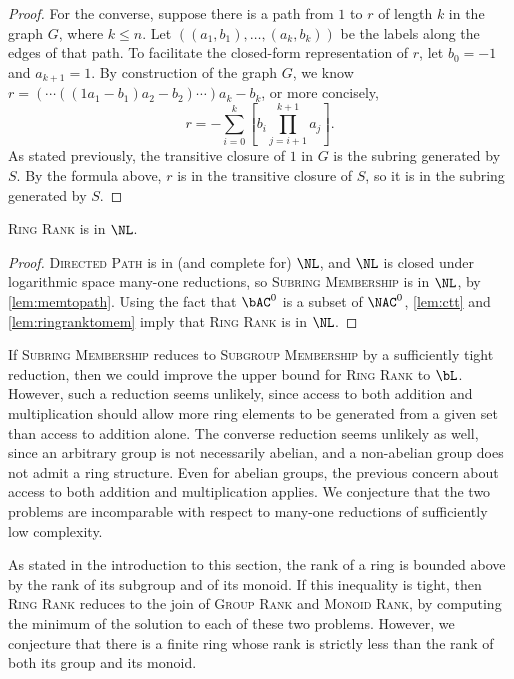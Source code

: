 \documentclass{article}
\begin{document}
\begin{proof}
  For the converse, suppose there is a path from $1$ to $r$ of length $k$ in the graph $G$, where $k \leq n$.
  Let $((a_1, b_1), \dotsc, (a_k, b_k))$ be the labels along the edges of that path.
  To facilitate the closed-form representation of $r$, let $b_0 = -1$ and $a_{k + 1} = 1$.
  By construction of the graph $G$, we know $r = (\dotsb ((1 a_1 - b_1) a_2 - b_2) \dotsb) a_k - b_k$, or more concisely,
  \begin{equation*}
    r = -\sum_{i = 0}^k \left[b_i \prod_{j = i + 1}^{k + 1} a_j\right].
  \end{equation*}
  As stated previously, the transitive closure of $1$ in $G$ is the subring generated by $S$.
  By the formula above, $r$ is in the transitive closure of $S$, so it is in the subring generated by $S$.
\end{proof}

\begin{theorem}\label{thm:ringrank}
  \textsc{Ring Rank} is in $\NL$.
\end{theorem}
\begin{proof}
  \textsc{Directed Path} is in (and complete for) $\NL$, and $\NL$ is closed under logarithmic space many-one reductions, so \textsc{Subring Membership} is in $\NL$, by \autoref{lem:memtopath}.
  Using the fact that $\bAC^0$ is a subset of $\NAC^0$, \autoref{lem:ctt} and \autoref{lem:ringranktomem} imply that \textsc{Ring Rank} is in $\NL$.
\end{proof}

If \textsc{Subring Membership} reduces to \textsc{Subgroup Membership} by a sufficiently tight reduction, then we could improve the upper bound for \textsc{Ring Rank} to $\bL$.
However, such a reduction seems unlikely, since access to both addition and multiplication should allow more ring elements to be generated from a given set than access to addition alone.
The converse reduction seems unlikely as well, since an arbitrary group is not necessarily abelian, and a non-abelian group does not admit a ring structure.
Even for abelian groups, the previous concern about access to both addition and multiplication applies.
We conjecture that the two problems are incomparable with respect to many-one reductions of sufficiently low complexity.

As stated in the introduction to this section, the rank of a ring is bounded above by the rank of its subgroup and of its monoid.
If this inequality is tight, then \textsc{Ring Rank} reduces to the join of \textsc{Group Rank} and \textsc{Monoid Rank}, by computing the minimum of the solution to each of these two problems.
However, we conjecture that there is a finite ring whose rank is strictly less than the rank of both its group and its monoid.
\end{document}
